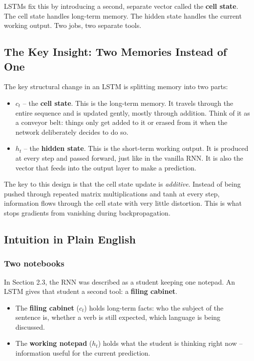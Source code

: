 \documentclass[12pt,a4paper]{article}
\begin{document}
LSTMs fix this by introducing a second, separate vector called the \textbf{cell state}.
The cell state handles long-term memory. The hidden state handles the current working
output. Two jobs, two separate tools.

\subsection{The Key Insight: Two Memories Instead of One}

The key structural change in an LSTM is splitting memory into two parts:

\begin{itemize}
    \item $c_t$ -- the \textbf{cell state}. This is the long-term memory. It travels
    through the entire sequence and is updated gently, mostly through addition. Think
    of it as a conveyor belt: things only get added to it or erased from it when
    the network deliberately decides to do so.
    \item $h_t$ -- the \textbf{hidden state}. This is the short-term working output.
    It is produced at every step and passed forward, just like in the vanilla RNN.
    It is also the vector that feeds into the output layer to make a prediction.
\end{itemize}

The key to this design is that the cell state update is \textit{additive}. Instead of
being pushed through repeated matrix multiplications and tanh at every step, information
flows through the cell state with very little distortion. This is what stops gradients
from vanishing during backpropagation.

\subsection{Intuition in Plain English}

\subsubsection{Two notebooks}

In Section 2.3, the RNN was described as a student keeping one notepad. An LSTM
gives that student a second tool: a \textbf{filing cabinet}.

\begin{itemize}
    \item The \textbf{filing cabinet} ($c_t$) holds long-term facts: who the subject
    of the sentence is, whether a verb is still expected, which language is being
    discussed.
    \item The \textbf{working notepad} ($h_t$) holds what the student is thinking
    right now -- information useful for the current prediction.
\end{itemize}
\end{document}
